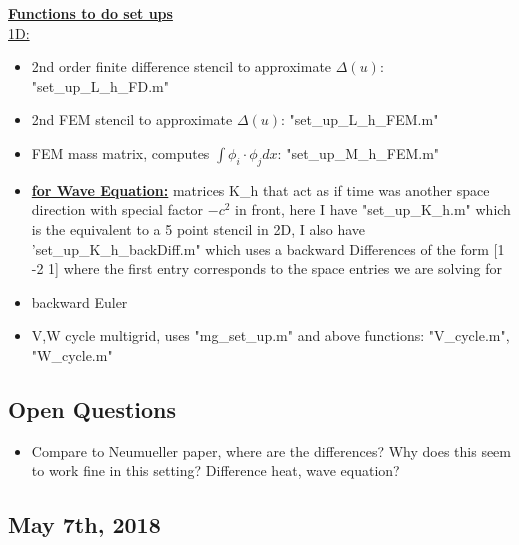 \documentclass[a4paper, 11pt]{article}
\begin{document}
\underline{\textbf{Functions to do set ups}} \\

\underline{1D:}
\begin{itemize}
\item 2nd order finite difference stencil to approximate $\Delta(u)$: "set\_up\_L\_h\_FD.m"
\item 2nd FEM stencil to approximate $\Delta(u)$: "set\_up\_L\_h\_FEM.m"
\item FEM mass matrix, computes $\int \phi_i \cdot \phi_j dx$: "set\_up\_M\_h\_FEM.m"

\item \underline{\textbf{for Wave Equation:}} matrices K\_h that act as if time was another space direction with special factor $-c^2$ in front, here I have "set\_up\_K\_h.m" which is the equivalent to a 5 point stencil in 2D, I also have 'set\_up\_K\_h\_backDiff.m" which uses a backward Differences of the form [1 -2 1] where the first entry corresponds to the space entries we are solving for

\item backward Euler
\item V,W cycle multigrid, uses "mg\_set\_up.m" and above functions: "V\_cycle.m", "W\_cycle.m"

\end{itemize}

\subsection*{Open Questions}
\begin{itemize}
	\item Compare to Neumueller paper, where are the differences? Why does this seem to work fine in this setting? Difference heat, wave equation? 
\end{itemize}

\subsection*{May 7th, 2018}
\end{document}
